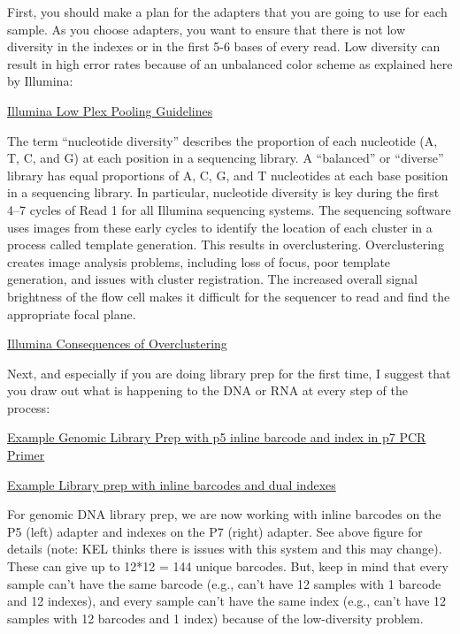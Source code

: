 \documentclass[
  letterpaper,
  DIV=11,
  numbers=noendperiod]{scrreprt}
\begin{document}
First, you should make a plan for the adapters that you are going to use
for each sample. As you choose adapters, you want to ensure that there
is not low diversity in the indexes or in the first 5-6 bases of every
read. Low diversity can result in high error rates because of an
unbalanced color scheme as explained here by Illumina:

\href{https://www.illumina.com/documents/products/technotes/technote-nextera-rapid-capture-low-plex-pooling-guidelines.pdf}{Illumina
Low Plex Pooling Guidelines}

The term ``nucleotide diversity'' describes the proportion of each
nucleotide (A, T, C, and G) at each position in a sequencing library. A
``balanced'' or ``diverse'' library has equal proportions of A, C, G,
and T nucleotides at each base position in a sequencing library. In
particular, nucleotide diversity is key during the first 4--7 cycles of
Read 1 for all Illumina sequencing systems. The sequencing software uses
images from these early cycles to identify the location of each cluster
in a process called template generation. This results in overclustering.
Overclustering creates image analysis problems, including loss of focus,
poor template generation, and issues with cluster registration. The
increased overall signal brightness of the flow cell makes it difficult
for the sequencer to read and find the appropriate focal plane.

\href{https://support.illumina.com/content/dam/illumina-marketing/documents/products/other/miseq-overclustering-primer-770-2014-038.pdf}{Illumina
Consequences of Overclustering}

Next, and especially if you are doing library prep for the first time, I
suggest that you draw out what is happening to the DNA or RNA at every
step of the process:

\href{https://docs.google.com/spreadsheets/d/1VSqr03MbtS0hFzgnOu3-oHL2fzf4qL5jfEEyDE76bv4/edit\#gid=0}{Example
Genomic Library Prep with p5 inline barcode and index in p7 PCR Primer}

\href{https://docs.google.com/document/d/1xr99sMucP-x2rK6K61vtGHKNahl9UYFwh_oEb0AtHX8/edit}{Example
Library prep with inline barcodes and dual indexes}

For genomic DNA library prep, we are now working with inline barcodes on
the P5 (left) adapter and indexes on the P7 (right) adapter. See above
figure for details (note: KEL thinks there is issues with this system
and this may change). These can give up to 12*12 = 144 unique barcodes.
But, keep in mind that every sample can't have the same barcode (e.g.,
can't have 12 samples with 1 barcode and 12 indexes), and every sample
can't have the same index (e.g., can't have 12 samples with 12 barcodes
and 1 index) because of the low-diversity problem.
\end{document}
